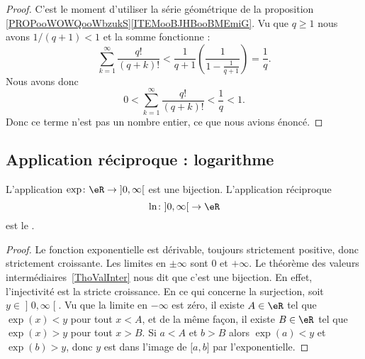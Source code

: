 \begin{proof}
    C'est le moment d'utiliser la série géométrique de la proposition \ref{PROPooWOWQooWbzukS}\ref{ITEMooBJHBooBMEmiG}. Vu que \( q\geq 1\) nous avons \( 1/(q+1)<1\) et la somme fonctionne :
    \begin{equation}
        \sum_{k=1}^{\infty}\frac{ q! }{ (q+k)! }<\frac{1}{ q+1 }\left( \frac{1}{ 1-\frac{1}{ q+1 } } \right)=\frac{1}{ q }.
    \end{equation}
    Nous avons donc 
    \begin{equation}
        0< \sum_{k=1}^{\infty}\frac{ q! }{ (q+k)! }<\frac{1}{ q }<1.
    \end{equation}
    Donc ce terme n'est pas un nombre entier, ce que nous avions énoncé.
\end{proof}

\subsection{Application réciproque : logarithme}

\begin{propositionDef}    \label{DEFooELGOooGiZQjt}
	L'application \(\exp\colon \eR\to \mathopen] 0 , \infty \mathclose[\) est une bijection. L'application réciproque
	\begin{equation}
		\ln\colon \mathopen] 0 , \infty \mathclose[\to \eR
	\end{equation}
	est le .
\end{propositionDef}

\begin{proof}
	Le fonction exponentielle est dérivable, toujours strictement positive, donc strictement croissante. Les limites en \( \pm \infty\) sont \( 0\) et \( +\infty\). Le théorème des valeurs intermédiaires~\ref{ThoValInter} nous dit que c'est une bijection. En effet, l'injectivité est la stricte croissance. En ce qui concerne la surjection, soit \( y\in \mathopen] 0 , \infty \mathclose[\). Vu que la limite en \( -\infty\) est zéro, il existe \( A\in \eR\) tel que \( \exp(x)<y\) pour tout \( x<A\), et de la même façon, il existe \( B\in \eR\) tel que \( \exp(x)>y\) pour tout \( x>B\). Si \( a<A\) et \( b>B\) alors \( \exp(a)<y\) et \( \exp(b)>y\), donc \( y\) est dans l'image de \( \mathopen[ a , b \mathclose]\) par l'exponentielle.
\end{proof}


